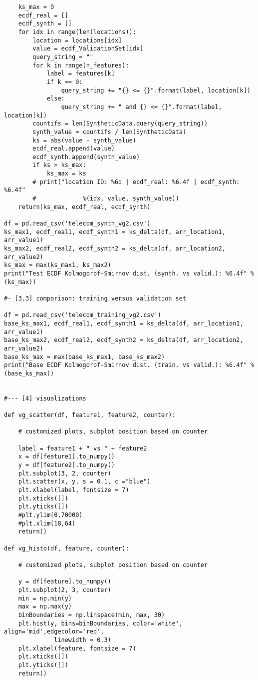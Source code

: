 \documentclass[oneside,10pt]{book}
\begin{document}
\begin{lstlisting}
    ks_max = 0
    ecdf_real = []
    ecdf_synth = []
    for idx in range(len(locations)):
        location = locations[idx]
        value = ecdf_ValidationSet[idx]
        query_string = ""
        for k in range(n_features):
            label = features[k]
            if k == 0:
                query_string += "{} <= {}".format(label, location[k])
            else:
                query_string += " and {} <= {}".format(label, location[k])
        countifs = len(SyntheticData.query(query_string))
        synth_value = countifs / len(SyntheticData)
        ks = abs(value - synth_value)
        ecdf_real.append(value)
        ecdf_synth.append(synth_value)
        if ks > ks_max:
            ks_max = ks
        # print("location ID: %6d | ecdf_real: %6.4f | ecdf_synth: %6.4f"
        #             %(idx, value, synth_value))
    return(ks_max, ecdf_real, ecdf_synth)

df = pd.read_csv('telecom_synth_vg2.csv')
ks_max1, ecdf_real1, ecdf_synth1 = ks_delta(df, arr_location1, arr_value1)
ks_max2, ecdf_real2, ecdf_synth2 = ks_delta(df, arr_location2, arr_value2)
ks_max = max(ks_max1, ks_max2)
print("Test ECDF Kolmogorof-Smirnov dist. (synth. vs valid.): %6.4f" %(ks_max))

#- [3.3] comparison: training versus validation set

df = pd.read_csv('telecom_training_vg2.csv')
base_ks_max1, ecdf_real1, ecdf_synth1 = ks_delta(df, arr_location1, arr_value1)
base_ks_max2, ecdf_real2, ecdf_synth2 = ks_delta(df, arr_location2, arr_value2)
base_ks_max = max(base_ks_max1, base_ks_max2)
print("Base ECDF Kolmogorof-Smirnov dist. (train. vs valid.): %6.4f" %(base_ks_max))


#--- [4] visualizations

def vg_scatter(df, feature1, feature2, counter):

    # customized plots, subplot position based on counter

    label = feature1 + " vs " + feature2
    x = df[feature1].to_numpy()
    y = df[feature2].to_numpy()
    plt.subplot(3, 2, counter)
    plt.scatter(x, y, s = 0.1, c ="blue")
    plt.xlabel(label, fontsize = 7)
    plt.xticks([])
    plt.yticks([])
    #plt.ylim(0,70000)
    #plt.xlim(18,64)
    return()

def vg_histo(df, feature, counter):

    # customized plots, subplot position based on counter

    y = df[feature].to_numpy()
    plt.subplot(2, 3, counter)
    min = np.min(y)
    max = np.max(y)
    binBoundaries = np.linspace(min, max, 30)
    plt.hist(y, bins=binBoundaries, color='white', align='mid',edgecolor='red',
              linewidth = 0.3)
    plt.xlabel(feature, fontsize = 7)
    plt.xticks([])
    plt.yticks([])
    return()


\end{lstlisting}
\end{document}
